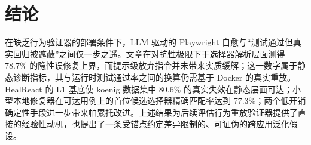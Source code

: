 \section{结论}
\label{sec:conclusion}

在缺乏行为验证器的部署条件下，LLM 驱动的 Playwright 自愈与“测试通过但真实回归被遮蔽”之间仅一步之遥。文章在对抗性极限下于选择器解析层面测得 78.7\% 的隐性误修复上界，而提示级放弃指令并未带来实质缓解；这一数字属于静态诊断指标，其与运行时测试通过率之间的换算仍需基于 Docker 的真实重放。HealReact 的 L1 基底使 koenig 数据集中 80.6\% 的真实失效在静态层面可达；小型本地修复器在可达用例上的首位候选选择器精确匹配率达到 77.3\%；两个低开销确定性手段进一步带来帕累托改进。上述结果为后续评估行为重放验证器提供了直接的经验性动机，也提出了一条受锚点约定差异限制的、可证伪的跨应用泛化假设。

